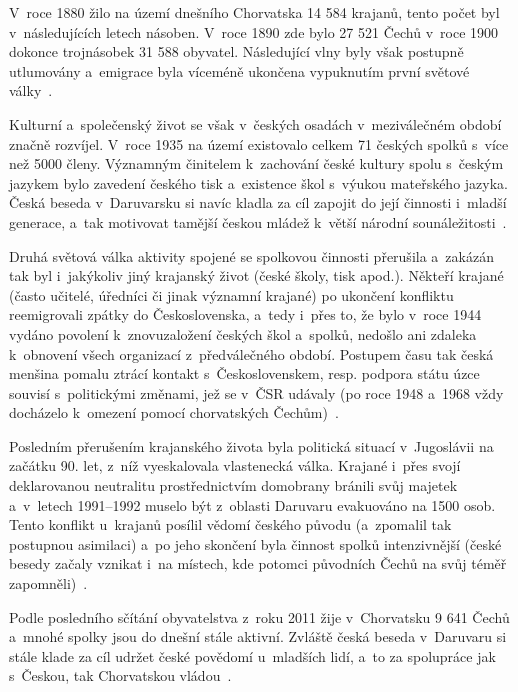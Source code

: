 V~roce 1880 žilo na území dnešního Chorvatska 14 584 krajanů, tento počet byl v~následujících letech násoben. V~roce 1890 zde bylo 27 521 Čechů v~roce 1900 dokonce trojnásobek 31 588 obyvatel. Následující vlny byly však postupně utlumovány a~emigrace byla víceméně ukončena vypuknutím první světové války~\parencite{Stranjik2017}.

Kulturní a~společenský život se však v~českých osadách v~meziválečném období značně rozvíjel. V~roce 1935 na území existovalo celkem 71 českých spolků s~více než 5000 členy. Významným činitelem k~zachování české kultury spolu s~českým jazykem bylo zavedení českého tisk a~existence škol s~výukou mateřského jazyka. Česká beseda v~Daruvarsku si navíc kladla za cíl zapojit do její činnosti i~mladší generace, a~tak motivovat tamější českou mládež k~větší národní sounáležitosti~\parencite{Preissova2020}.

Druhá světová válka aktivity spojené se spolkovou činnosti přerušila a~zakázán tak byl i~jakýkoliv jiný krajanský život (české školy, tisk apod.). Někteří krajané (často učitelé, úředníci či jinak významní krajané) po ukončení konfliktu reemigrovali zpátky do Československa, a~tedy i~přes to, že bylo v~roce 1944 vydáno povolení k~znovuzaložení českých škol a~spolků, nedošlo ani zdaleka k~obnovení všech organizací z~předválečného období. Postupem času tak česká menšina pomalu ztrácí kontakt s~Československem, resp. podpora státu úzce souvisí s~politickými změnami, jež se v~ČSR udávaly (po roce 1948 a~1968 vždy docházelo k~omezení pomocí chorvatských Čechům)~\parencite{Preissova2020}.

Posledním přerušením krajanského života byla politická situací v~Jugoslávii na začátku 90. let, z~níž vyeskalovala vlastenecká válka. Krajané i~přes svojí deklarovanou neutralitu prostřednictvím domobrany bránili svůj majetek a~v~letech 1991--1992 muselo být z~oblasti Daruvaru evakuováno na 1500 osob. Tento konflikt u~krajanů posílil vědomí českého původu (a~zpomalil tak postupnou asimilaci) a~po jeho skončení byla činnost spolků intenzivnější (české besedy začaly vznikat i~na místech, kde potomci původních Čechů na svůj téměř zapomněli)~\parencite{Stranjik2017}.

Podle posledního sčítání obyvatelstva z~roku 2011 žije v~Chorvatsku 9 641 Čechů a~mnohé spolky jsou do dnešní stále aktivní. Zvláště česká beseda v~Daruvaru si stále klade za cíl udržet české povědomí u~mladších lidí, a~to za spolupráce jak s~Českou, tak Chorvatskou vládou~\parencite{Kokaisl2012}.

